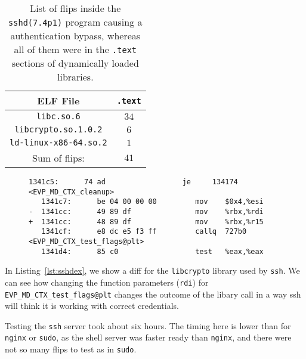 \begin{table}[!htb]
\centering
\begin{tabular}{c|c}
ELF File               & \texttt{.text} \\ \hline
\texttt{libc.so.6}         & $34$ \\
\texttt{libcrypto.so.1.0.2} & $6$ \\
\texttt{ld-linux-x86-64.so.2} & $1$ \\ \hline
Sum of flips:                 & $41$
\end{tabular}
\caption{List of flips inside the \texttt{sshd(7.4p1)} program
causing a authentication bypass, whereas all of them were in the \texttt{.text}
sections of dynamically loaded libraries.}
\label{tab:sshdres}
\end{table}

\begin{figure}
\begin{minipage}{\linewidth}
\begin{lstlisting}[style=diff,
                   caption={Diff for a bitflip applied to the
\texttt{libcrypto.so.1.0.2} binary in order to bypass a credential check. The
move from \texttt{rbx} to \texttt{rdi} is exchanged with a move to
\texttt{r15}, this changes the parameter for \texttt{EVP\_MD\_CTX\_test\_flags},
which is highly likely to result in a different outcome.},
label=lst:sshdex]
   1341c5:      74 ad                  je     134174 <EVP_MD_CTX_cleanup>
   1341c7:      be 04 00 00 00         mov    $0x4,%esi
-  1341cc:      49 89 df               mov    %rbx,%rdi
+  1341cc:      48 89 df               mov    %rbx,%r15
   1341cf:      e8 dc e5 f3 ff         callq  727b0 <EVP_MD_CTX_test_flags@plt>
   1341d4:      85 c0                  test   %eax,%eax
\end{lstlisting}
\end{minipage}
\end{figure}

In Listing~\ref{lst:sshdex}, we show a diff for the \texttt{libcrypto} library
used by \texttt{ssh}. We can see how changing the function parameters
(\texttt{rdi}) for \texttt{EVP\_MD\_CTX\_test\_flags@plt} changes the outcome
of the libary call in a way ssh will think it is working with correct
credentials.

Testing the \texttt{ssh} server took about six hours. The timing here is lower
than for \texttt{nginx} or \texttt{sudo}, as the shell server was faster ready
than \texttt{nginx}, and there were not so many flips to test as in
\texttt{sudo}.

